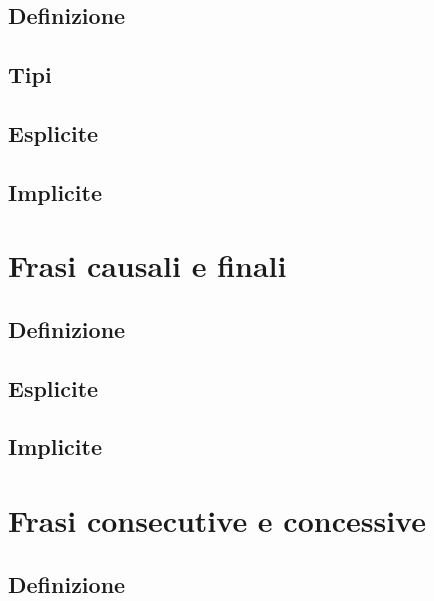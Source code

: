 \documentclass[
  a4paper,
  twoside,
  11pt,
  chapterprefix=false,
  bibliography=totocnumbered,
  listof=flat]{scrbook}
\begin{document}
\hypertarget{definizione-1}{%
\section{Definizione}\label{definizione-1}}

\hypertarget{tipi-2}{%
\section{Tipi}\label{tipi-2}}

\hypertarget{esplicite-2}{%
\section{Esplicite}\label{esplicite-2}}

\hypertarget{implicite-2}{%
\section{Implicite}\label{implicite-2}}

\hypertarget{frasi-causali-e-finali}{%
\chapter{Frasi causali e finali}\label{frasi-causali-e-finali}}

\hypertarget{definizione-2}{%
\section{Definizione}\label{definizione-2}}

\hypertarget{esplicite-3}{%
\section{Esplicite}\label{esplicite-3}}

\hypertarget{implicite-3}{%
\section{Implicite}\label{implicite-3}}

\hypertarget{frasi-consecutive-e-concessive}{%
\chapter{Frasi consecutive e concessive}\label{frasi-consecutive-e-concessive}}

\hypertarget{definizione-3}{%
\section{Definizione}\label{definizione-3}}
\end{document}
